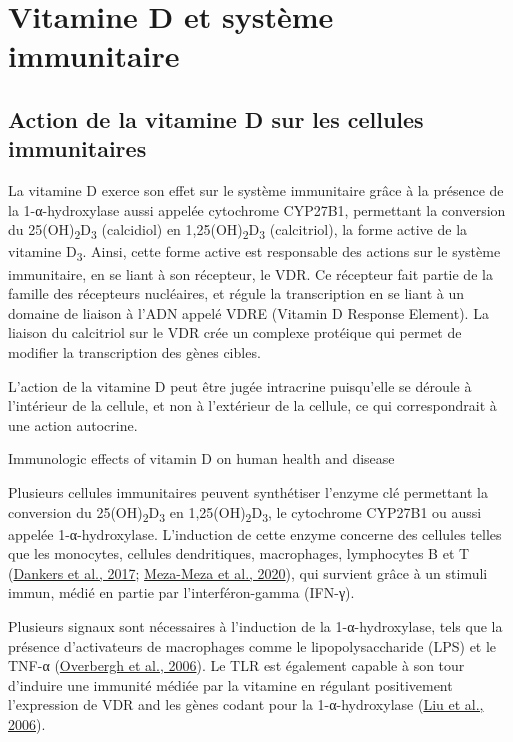 \documentclass[
  a4paper,
  DIV=11,
  numbers=noendperiod,
  listof=totoc]{scrreprt}
\begin{document}
\hypertarget{vitamine-d-et-systuxe8me-immunitaire}{%
\chapter{Vitamine D et système
immunitaire}\label{vitamine-d-et-systuxe8me-immunitaire}}

\hypertarget{action-de-la-vitamine-d-sur-les-cellules-immunitaires}{%
\section{Action de la vitamine D sur les cellules
immunitaires}\label{action-de-la-vitamine-d-sur-les-cellules-immunitaires}}

La vitamine D exerce son effet sur le système immunitaire grâce à la
présence de la 1-α-hydroxylase aussi appelée cytochrome CYP27B1,
permettant la conversion du 25(OH)\textsubscript{2}D\textsubscript{3}
(calcidiol) en 1,25(OH)\textsubscript{2}D\textsubscript{3} (calcitriol),
la forme active de la vitamine D\textsubscript{3}. Ainsi, cette forme
active est responsable des actions sur le système immunitaire, en se
liant à son récepteur, le VDR. Ce récepteur fait partie de la famille
des récepteurs nucléaires, et régule la transcription en se liant à un
domaine de liaison à l'ADN appelé VDRE (Vitamin D Response Element). La
liaison du calcitriol sur le VDR crée un complexe protéique qui permet
de modifier la transcription des gènes cibles.

L'action de la vitamine D peut être jugée intracrine puisqu'elle se
déroule à l'intérieur de la cellule, et non à l'extérieur de la cellule,
ce qui correspondrait à une action autocrine.

Immunologic effects of vitamin D on human health and disease

Plusieurs cellules immunitaires peuvent synthétiser l'enzyme clé
permettant la conversion du 25(OH)\textsubscript{2}D\textsubscript{3} en
1,25(OH)\textsubscript{2}D\textsubscript{3}, le cytochrome CYP27B1 ou
aussi appelée 1-α-hydroxylase. L'induction de cette enzyme concerne des
cellules telles que les monocytes, cellules dendritiques, macrophages,
lymphocytes B et T (\protect\hyperlink{ref-Dankers.2017}{Dankers et al.,
2017}; \protect\hyperlink{ref-Meza-Meza.2020}{Meza-Meza et al., 2020}),
qui survient grâce à un stimuli immun, médié en partie par
l'interféron-gamma (IFN-γ).

Plusieurs signaux sont nécessaires à l'induction de la 1-α-hydroxylase,
tels que la présence d'activateurs de macrophages comme le
lipopolysaccharide (LPS) et le TNF-α
(\protect\hyperlink{ref-Overbergh.2006}{Overbergh et al., 2006}). Le TLR
est également capable à son tour d'induire une immunité médiée par la
vitamine en régulant positivement l'expression de VDR and les gènes
codant pour la 1-α-hydroxylase (\protect\hyperlink{ref-Liu.2006}{Liu et
al., 2006}).
\end{document}
